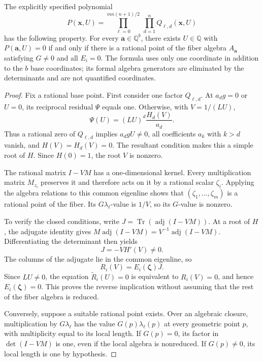 \begin{theorem}\label{thm:explicit-guarded-finite-algebra}
The explicitly specified polynomial
\[
 P(\mathbf x,U)=
 \prod_{\ell=0}^{m n(n+1)/2}\ \prod_{d=1}^{n} Q_{\ell,d}(\mathbf x,U)
\]
has the following property. For every $\mathbf a\in\mathbb Q^b$,
there exists $U\in\mathbb Q$ with $P(\mathbf a,U)=0$ if and only if
there is a rational point of the fiber algebra $A_{\mathbf a}$ satisfying
$G\ne0$ and all $E_i=0$. The formula uses only one coordinate in addition
to the $b$ base coordinates; its formal algebra generators are eliminated
by the determinants and are not quantified coordinates.
\end{theorem}
\begin{proof}
Fix a rational base point. First consider one factor $Q_{\ell,d}$.
At $a_dg=0$ or $U=0$, its reciprocal residual $\Psi$ equals one.
Otherwise, with $V=1/(LU)$,
\[
 \Psi(U)=(LU)^d\frac{H_d(V)}{a_d}.
\]
Thus a rational zero of $Q_{\ell,d}$ implies $a_dgU\ne0$, all
coefficients $a_k$ with $k>d$ vanish, and $H(V)=H_d(V)=0$.
The resultant condition makes this a simple root of $H$. Since
$H(0)=1$, the root $V$ is nonzero.

The rational matrix $I-VM$ has a one-dimensional kernel. Every
multiplication matrix $M_{z_i}$ preserves it and therefore acts on
it by a rational scalar $\zeta_i$. Applying the algebra relations
to this common eigenline shows that $(\zeta_1,\ldots,\zeta_m)$ is
a rational point of the fiber. Its $G\lambda_\ell$-value is $1/V$,
so its $G$-value is nonzero.

To verify the closed conditions, write
$J=\operatorname{Tr}(\operatorname{adj}(I-VM))$. At a root of $H$,
the adjugate identity gives
$M\operatorname{adj}(I-VM)=V^{-1}\operatorname{adj}(I-VM)$.
Differentiating the determinant then yields
\[
 J=-V H'(V)\ne0.
\]
The columns of the adjugate lie in the common eigenline, so
\[
 R_i(V)=E_i(\boldsymbol\zeta)J.
\]
Since $LU\ne0$, the equation $\widetilde R_i(U)=0$ is equivalent
to $R_i(V)=0$, and hence $E_i(\boldsymbol\zeta)=0$. This proves
the reverse implication without assuming that the rest of the fiber
algebra is reduced.

Conversely, suppose a suitable rational point exists. Over an
algebraic closure, multiplication by $G\lambda_\ell$ has the
value $G(p)\lambda_\ell(p)$ at every geometric point $p$, with
multiplicity equal to its local length. If $G(p)=0$, its factor
in $\det(I-VM)$ is one, even if the local algebra is nonreduced.
If $G(p)\ne0$, its local length is one by hypothesis.


\end{proof}
